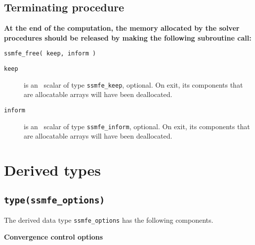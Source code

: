 \subsection{Terminating procedure}

{\bf
At the end of the computation, the memory 
allocated by the solver procedures
should be released
by making the following subroutine call:
}

\medskip

\hspace{8mm} {\tt ssmfe\_free( keep, inform )}

\begin{description}
%
\item[\texttt{keep}] is an \intentinout\ scalar of type 
{\tt ssmfe\_keep}, optional. 
On exit, its components that are allocatable arrays will have been deallocated. 
%
\item[\texttt{inform}] is an \intentinout\ scalar of type {\tt ssmfe\_inform}, 
optional.
On exit, its components that are allocatable arrays will have been deallocated. 
%
\end{description}

\section{Derived types}

\subsection{\texttt{type(ssmfe\_options)}}
\label{ssmfe:type:options}

The derived data type
{\tt ssmfe\_options}
has the following components.

\bigskip
\noindent
{\bf Convergence control options}

